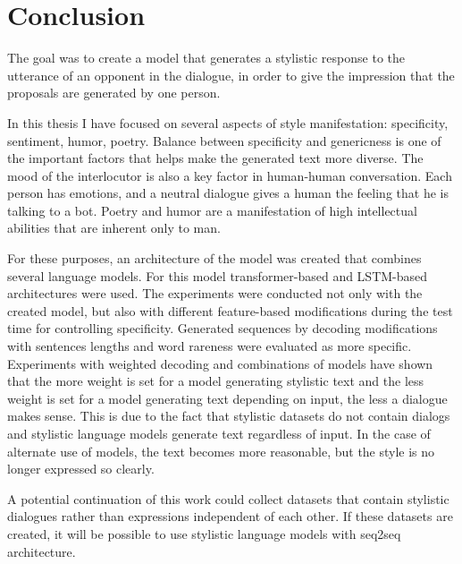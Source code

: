 \chapter{Conclusion} \label{conclusion}
The goal was to create a model that generates a stylistic response to the utterance of an opponent in the dialogue, in order to give the impression that the proposals are generated by one person.

In this thesis I have focused on several aspects of style manifestation: specificity, sentiment, humor, poetry. Balance between specificity and genericness is one of the important factors that helps make the generated text more diverse. The mood of the interlocutor is also a key factor in human-human conversation. Each person has emotions, and a neutral dialogue gives a human the feeling that he is talking to a bot. Poetry and humor are a manifestation of high intellectual abilities that are inherent only to man.

For these purposes, an architecture of the model was created that combines several language models. For this model transformer-based and LSTM-based architectures were used. The experiments were conducted not only with the created model, but also with different feature-based modifications during the test time for controlling specificity. Generated sequences by decoding modifications with sentences lengths and word rareness were evaluated as more specific. Experiments with weighted decoding and combinations of models have shown that the more weight is set for a model generating stylistic text and the less weight is set for a model generating text depending on input, the less a dialogue makes sense. This is due to the fact that stylistic datasets do not contain dialogs and stylistic language models generate text regardless of input. In the case of alternate use of models, the text becomes more reasonable, but the style is no longer expressed so clearly.


A potential continuation of this work could collect datasets that contain stylistic dialogues rather than expressions independent of each other. If these datasets are created, it will be possible to use stylistic language models with seq2seq architecture.